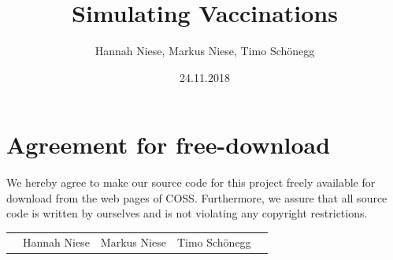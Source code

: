 \documentclass[11pt]{article}
\title{Simulating Vaccinations}
\author{Hannah Niese, Markus Niese, Timo Schönegg}
\date{24.11.2018}
\begin{document}

\newpage


\newpage
\section*{Agreement for free-download}
\bigskip


\bigskip


\large We hereby agree to make our source code for this project freely available for download from the web pages of COSS. Furthermore, we assure that all source code is written by ourselves and is not violating any copyright restrictions.

\begin{center}

\bigskip


\bigskip


\begin{tabular}{@{}p{0.5cm}@{}p{5.5cm}@{}p{5.5cm}@{}p{5.5cm}@{}p{1cm}}
\begin{minipage}{1cm}

\end{minipage}
&
\begin{minipage}{5cm}
\vspace{2mm} \large Hannah Niese

 \vspace{\baselineskip}

\end{minipage}
&
\begin{minipage}{5cm}

\large Markus Niese

\end{minipage}
&
\begin{minipage}{5cm}

\large Timo Schönegg

\end{minipage}
&
\begin{minipage}{1cm}

\end{minipage}

\end{tabular}


\end{center}
\newpage




\end{document}
